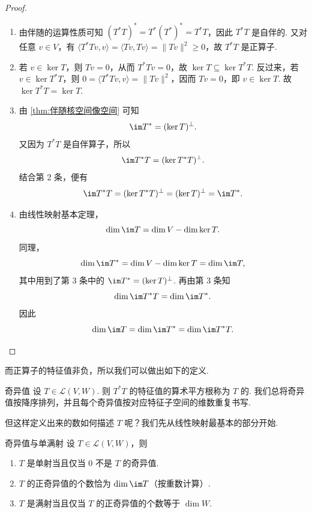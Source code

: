 \begin{proof}
    \begin{enumerate}
        \item 由伴随的运算性质可知 $(T^*T)^* = T^*(T^*)^* = T^*T$，因此 $T^*T$ 是自伴的. 又对任意 $v \in V$，有 $\langle T^*Tv, v \rangle = \langle Tv, Tv \rangle = \lVert Tv \rVert^2 \geqslant 0$，故 $T^*T$ 是正算子.

        \item 若 $v \in \ker T$，则 $Tv = 0$，从而 $T^*Tv = 0$，故 $\ker T \subseteq \ker T^*T$. 反过来，若 $v \in \ker T^*T$，则 $0 = \langle T^*Tv, v \rangle = \lVert Tv \rVert^2$，因而 $Tv = 0$，即 $v \in \ker T$. 故 $\ker T^*T = \ker T$.

        \item 由 \autoref{thm:伴随核空间像空间} 可知
              \[
                  \im T^* = (\ker T)^{\perp}.
              \]
              又因为 $T^*T$ 是自伴算子，所以
              \[
                  \im T^*T = (\ker T^*T)^{\perp}.
              \]
              结合第 2 条，便有
              \[
                  \im T^*T = (\ker T^*T)^{\perp} = (\ker T)^{\perp} = \im T^*.
              \]

        \item 由线性映射基本定理，
              \[
                  \dim \im T = \dim V - \dim \ker T.
              \]
              同理，
              \[
                  \dim \im T^* = \dim V - \dim \ker T = \dim \im T,
              \]
              其中用到了第 3 条中的 $\im T^* = (\ker T)^\perp$. 再由第 3 条知
              \[
                  \dim \im T^*T = \dim \im T^*.
              \]
              因此
              \[
                  \dim \im T = \dim \im T^* = \dim \im T^*T.
              \]
    \end{enumerate}
\end{proof}

而正算子的特征值非负，所以我们可以做出如下的定义.

\begin{definition}{奇异值}{} 
    设 $T \in \mathcal{L}(V, W)$. 则 $T^*T$ 的特征值的算术平方根称为 $T$ 的. 我们总将奇异值按降序排列，并且每个奇异值按对应特征子空间的维数重复书写.
\end{definition}

但这样定义出来的数如何描述 $T$ 呢？我们先从线性映射最基本的部分开始.

\begin{theorem}{}{奇异值与单满射}
    设 $T \in \mathcal{L}(V, W)$，则
    \begin{enumerate}
        \item $T$ 是单射当且仅当 $0$ 不是 $T$ 的奇异值.

        \item $T$ 的正奇异值的个数恰为 $\dim \im T$（按重数计算）.

        \item $T$ 是满射当且仅当 $T$ 的正奇异值的个数等于 $\dim W$.
    \end{enumerate}
\end{theorem}

